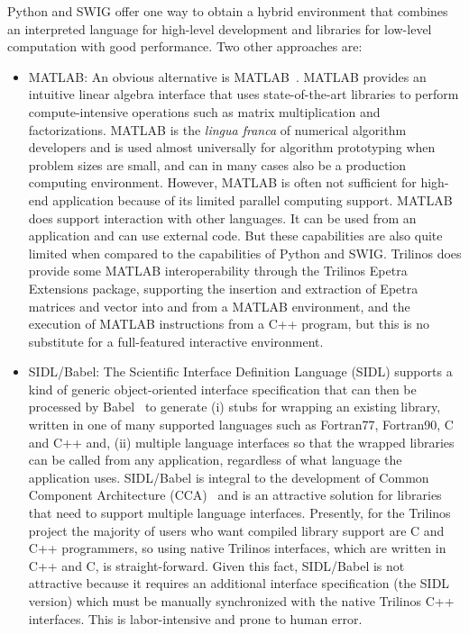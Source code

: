 \documentclass[acmtocl]{acmtrans2m}
\begin{document}
Python and SWIG offer one way to obtain a hybrid environment that
combines an interpreted language for high-level development and
libraries for low-level computation with good performance.  Two
other approaches are:
\begin{itemize}
    \item MATLAB: An obvious alternative is MATLAB~\cite{Matlab-home-page}.
    MATLAB provides an intuitive linear algebra interface that uses
    state-of-the-art libraries to perform compute-intensive operations
such as matrix multiplication and factorizations.  MATLAB is the
{\it lingua franca} of numerical algorithm developers and is used
almost universally for algorithm prototyping when problem sizes are
small, and can in many cases also be a production computing
environment. However, MATLAB is often not sufficient for high-end
application because of its limited parallel computing support.
MATLAB does support interaction with other languages.  It can be
used from an application and can use external code.  But these
capabilities are also quite limited when compared to the
capabilities of Python and SWIG.  Trilinos does provide  some MATLAB
interoperability through the Trilinos Epetra Extensions package,
supporting the insertion and extraction of Epetra matrices and
vector into and from a MATLAB environment, and the execution of
MATLAB instructions from a C++ program, but this is no substitute
for a full-featured interactive environment.
    \item SIDL/Babel: The Scientific Interface Definition Language
    (SIDL) supports a kind of generic object-oriented interface
    specification that can then be processed by Babel~\cite{Babel-home-page}
    to generate (i) stubs for
    wrapping an existing library, written in one of many supported
    languages such as Fortran77, Fortran90, C and C++ and, (ii)
    multiple language interfaces so that the wrapped
    libraries can be called from any application, regardless of what
    language the application uses.  SIDL/Babel is integral to the
    development of Common Component Architecture (CCA)~\cite{cca}
    and is an attractive solution for libraries that need to support
    multiple language interfaces.  Presently, for the Trilinos project the
    majority of users who want compiled library support
    are C and C++ programmers, so using native Trilinos interfaces,
    which are written in C++ and C, is straight-forward.
    Given this fact, SIDL/Babel is not attractive because it
    requires an additional interface specification (the SIDL version)
    which must be
    manually synchronized with the native Trilinos C++ interfaces.
    This is labor-intensive and prone to human error.
\end{itemize}
\end{document}
